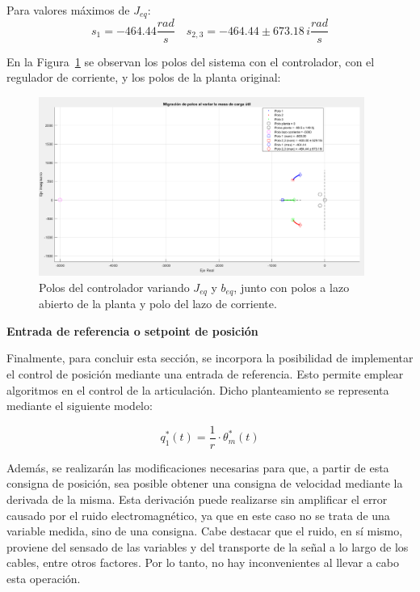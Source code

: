 \documentclass{article}
\begin{document}
Para valores máximos de $J_{eq}$:
\begin{equation}
s_1 = -464.44\frac{rad}{s} \quad s_{2,3} = -464.44 \pm 673.18\,i \frac{rad}{s}
\label{eq:polos_max}
\end{equation}

\newpage

En la Figura~\ref{fig:migracion_polos_controlador} se observan los polos del sistema con el controlador, con el regulador de corriente, y los polos de la planta original:

\begin{figure}[H]
    \centering
    \includegraphics[width=0.95\textwidth]{Imagenes/MigracionPolosControlador.png}
    \caption{Polos del controlador variando \(J_{eq}\) y \(b_{eq}\), junto con polos a lazo abierto de la planta y polo del lazo de corriente.}
    \label{fig:migracion_polos_controlador}
\end{figure}


\textbf{Entrada de referencia o setpoint de posición}

Finalmente, para concluir esta sección, se incorpora la posibilidad de implementar el control de posición mediante una entrada de referencia. Esto permite emplear algoritmos en el control de la articulación. Dicho planteamiento se representa mediante el siguiente modelo:

\[
q_1^*(t) = \frac{1}{r} \cdot \theta_m^*(t) \tag{Ec. 77}
\]

Además, se realizarán las modificaciones necesarias para que, a partir de esta consigna de posición, sea posible obtener una consigna de velocidad mediante la derivada de la misma. Esta derivación puede realizarse sin amplificar el error causado por el ruido electromagnético, ya que en este caso no se trata de una variable medida, sino de una consigna. Cabe destacar que el ruido, en sí mismo, proviene del sensado de las variables y del transporte de la señal a lo largo de los cables, entre otros factores. Por lo tanto, no hay inconvenientes al llevar a cabo esta operación.
\end{document}
